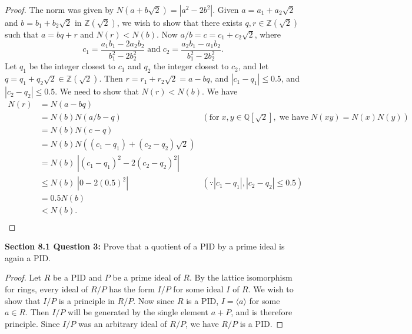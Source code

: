 \documentclass{article}
\begin{document}
  \begin{proof}
    The norm was given by $N(a+b\sqrt{2})=|a^2-2b^2|$. Given
    $a=a_1+a_2\sqrt{2}$ and $b=b_1+b_2\sqrt{2}$ in $\mathbb{Z}(\sqrt{2})$,
    we wish to show that there exists $q,r\in\mathbb{Z}(\sqrt{2})$ such
    that $a=bq+r$ and $N(r)<N(b)$. Now $a/b=c=c_1+c_2\sqrt{2}$, where
    \[c_1=\frac{a_1b_1-2a_2b_2}{b_1^2-2b_2^2}\; \text{and}\;
    c_2=\frac{a_2b_1-a_1b_2}{b_1^2-2b_2^2}.\] Let $q_1$ be the integer
    closest to $c_1$ and $q_2$ the integer closest to $c_2$, and let
    $q=q_1+q_2\sqrt{2}\in\mathbb{Z}(\sqrt{2})$. Then
    $r=r_1+r_2\sqrt{2}=a-bq$, and $|c_1-q_1|\leq0.5$, and
    $|c_2-q_2|\leq0.5$. We need to show that $N(r)<N(b)$. We have
    \begin{align*}
      N(r) &= N(a-bq) \\
        &=N(b)N(a/b-q) &(\text{for}\; x,y\in\mathbb{Q}[\sqrt{2}],\;
          \text{we have}\; N(xy)=N(x)N(y)) \\
        &=N(b)N(c-q) \\
        &=N(b)N\left((c_1-q_1)+(c_2-q_2)\sqrt{2}\right) \\
        &=N(b)\; \left|(c_1-q_1)^2-2(c_2-q_2)^2\right| \\
        &\leq N(b)\; \left|0-2(0.5)^2\right| &(\because
          |c_1-q_1|,|c_2-q_2|\leq0.5) \\
        &=0.5N(b) \\
        &<N(b). \\
    \end{align*}
  \end{proof}

\textbf{Section 8.1 Question 3:} Prove that a quotient of a PID by a prime
  ideal is again a PID.
  \begin{proof}
    Let $R$ be a PID and $P$ be a prime ideal of $R$.
    By the lattice isomorphism for rings, every ideal of $R/P$ has the form
    $I/P$ for some ideal $I$ of $R$. We wish to show that $I/P$ is a
    principle in $R/P$. Now since $R$ is a PID, $I=\langle a\rangle$ for
    some $a\in R$. Then $I/P$ will be generated by the single element
    $a+P$, and is therefore principle. Since $I/P$ was an arbitrary ideal of
    $R/P$, we have $R/P$ is a PID.
  \end{proof}
\end{document}
